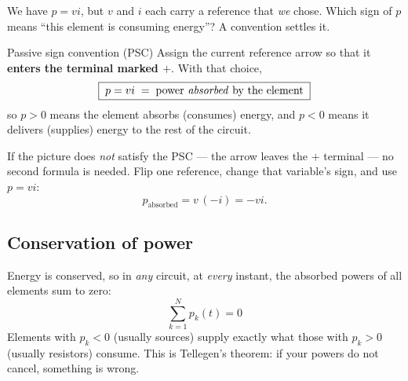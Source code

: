 \documentclass[11pt,a4paper]{article}
\newcommand{\Icol}[1]{\textcolor{ccur}{#1}}
\newcommand{\Vcol}[1]{\textcolor{cvolt}{#1}}
\begin{document}
We have $p = vi$, but $v$ and $i$ each carry a reference that \emph{we} chose. Which sign
of $p$ means ``this element is consuming energy''? A convention settles it.

\begin{definitionbox}{Passive sign convention (PSC)}
Assign the current reference arrow so that it \textbf{enters the terminal marked $+$}.
With that choice,
\[
  \boxed{\;p = vi \;=\; \text{power \emph{absorbed} by the element}\;}
\]
so $p > 0$ means the element absorbs (consumes) energy, and $p < 0$ means it delivers
(supplies) energy to the rest of the circuit.
\end{definitionbox}

\begin{center}
\end{center}

If the picture does \emph{not} satisfy the PSC --- the arrow leaves the $+$ terminal ---
no second formula is needed. Flip one reference, change that variable's sign, and use
$p = vi$:
\[
  p_{\text{absorbed}} = v\,(-i) = -vi .
\]

\subsection{Conservation of power}

Energy is conserved, so in \emph{any} circuit, at \emph{every} instant, the absorbed
powers of all elements sum to zero:
\[
  \boxed{\;\sum_{k=1}^{N} p_k(t) = 0\;}
\]
Elements with $p_k < 0$ (usually sources) supply exactly what those with $p_k > 0$
(usually resistors) consume. This is Tellegen's theorem: if your powers do not cancel,
something is wrong.
\end{document}
